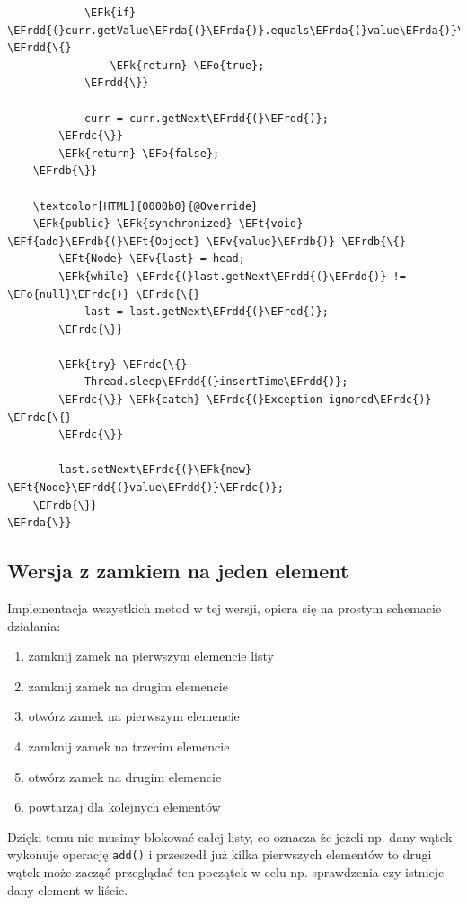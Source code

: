 \documentclass[11pt]{article}
\newcommand{\EFk}[1]{\textcolor{EFk}{#1}} %
\newcommand{\EFf}[1]{\textcolor{EFf}{#1}} %
\newcommand{\EFv}[1]{\textcolor{EFv}{#1}} %
\newcommand{\EFt}[1]{\textcolor{EFt}{#1}} %
\newcommand{\EFo}[1]{\textcolor{EFo}{#1}} %
\newcommand{\EFrda}[1]{#1} %
\newcommand{\EFrdb}[1]{\textcolor{EFrdb}{#1}} %
\newcommand{\EFrdc}[1]{\textcolor{EFrdc}{#1}} %
\newcommand{\EFrdd}[1]{\textcolor{EFrdd}{#1}} %
\begin{document}
\begin{Code}
\begin{Verbatim}
            \EFk{if} \EFrdd{(}curr.getValue\EFrda{(}\EFrda{)}.equals\EFrda{(}value\EFrda{)}\EFrdd{)} \EFrdd{\{}
                \EFk{return} \EFo{true};
            \EFrdd{\}}

            curr = curr.getNext\EFrdd{(}\EFrdd{)};
        \EFrdc{\}}
        \EFk{return} \EFo{false};
    \EFrdb{\}}

    \textcolor[HTML]{0000b0}{@Override}
    \EFk{public} \EFk{synchronized} \EFt{void} \EFf{add}\EFrdb{(}\EFt{Object} \EFv{value}\EFrdb{)} \EFrdb{\{}
        \EFt{Node} \EFv{last} = head;
        \EFk{while} \EFrdc{(}last.getNext\EFrdd{(}\EFrdd{)} != \EFo{null}\EFrdc{)} \EFrdc{\{}
            last = last.getNext\EFrdd{(}\EFrdd{)};
        \EFrdc{\}}

        \EFk{try} \EFrdc{\{}
            Thread.sleep\EFrdd{(}insertTime\EFrdd{)};
        \EFrdc{\}} \EFk{catch} \EFrdc{(}Exception ignored\EFrdc{)} \EFrdc{\{}
        \EFrdc{\}}

        last.setNext\EFrdc{(}\EFk{new} \EFt{Node}\EFrdd{(}value\EFrdd{)}\EFrdc{)};
    \EFrdb{\}}
\EFrda{\}}
\end{Verbatim}
\end{Code}
\subsection*{Wersja z zamkiem na jeden element}
\label{sec:org8483b7e}
Implementacja wszystkich metod w tej wersji, opiera się
na prostym schemacie działania:
\begin{enumerate}
\item zamknij zamek na pierwszym elemencie listy
\item zamknij zamek na drugim elemencie
\item otwórz zamek na pierwszym elemencie
\item zamknij zamek na trzecim elemencie
\item otwórz zamek na drugim elemencie
\item powtarzaj dla kolejnych elementów
\end{enumerate}

Dzięki temu nie musimy blokować całej listy, co
oznacza że jeżeli np. dany wątek wykonuje operację \texttt{add()}
i przeszedł już kilka pierwszych elementów to drugi
wątek może zacząć przeglądać ten początek w celu np.
sprawdzenia czy istnieje dany element w liście.
\end{document}
